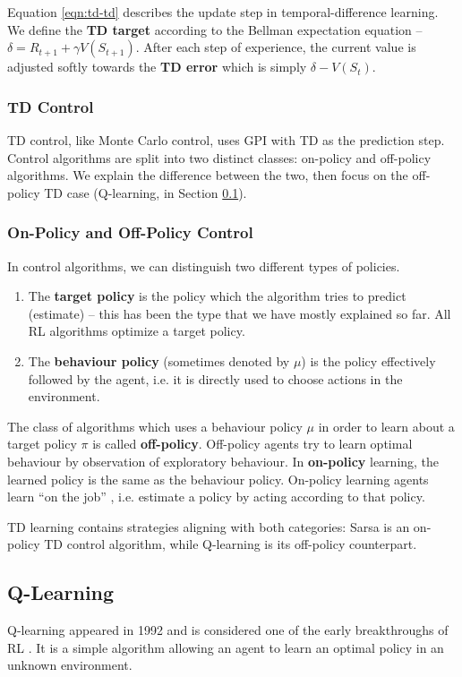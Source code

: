Equation \ref{eqn:td-td} describes the update step in temporal-difference learning.
We define the \textbf{TD target} according to the Bellman expectation equation -- $\delta = R_{t+1} + \gamma V(S_{t+1})$.
After each step of experience, the current value is adjusted softly towards the \textbf{TD error} which is simply $\delta - V(S_t)$.

\subsubsection{TD Control}
TD control, like Monte Carlo control, uses GPI with TD as the prediction step.
Control algorithms are split into two distinct classes: on-policy and off-policy algorithms.
We explain the difference between the two, then focus on the off-policy TD case (Q-learning, in Section \ref{rl:q-learning}).

\subsubsection{On-Policy and Off-Policy Control}
In control algorithms, we can distinguish two different types of policies.
\begin{enumerate}
    \item The \textbf{target policy} is the policy which the algorithm tries to predict (estimate) -- this has been the type that we have mostly explained so far.
    All RL algorithms optimize a target policy.
    \item The \textbf{behaviour policy} (sometimes denoted by $\mu$) is the policy effectively followed by the agent, i.e. it is directly used to choose actions in the environment.
\end{enumerate}

The class of algorithms which uses a behaviour policy $\mu$ in order to learn about a target policy $\pi$ is called \textbf{off-policy}.
Off-policy agents try to learn optimal behaviour by observation of exploratory behaviour.
In \textbf{on-policy} learning, the learned policy is the same as the behaviour policy.
On-policy learning agents learn ``on the job'' \cite{silver-lectures}, i.e. estimate a policy by acting according to that policy.


TD learning contains strategies aligning with both categories: Sarsa is an on-policy TD control algorithm, while Q-learning is its off-policy counterpart.

\subsection{Q-Learning} \label{rl:q-learning}
Q-learning \cite{Watkins1992} appeared in 1992 and is considered one of the early breakthroughs of RL \cite{rlai}.
It is a simple algorithm allowing an agent to learn an optimal policy in an unknown environment.